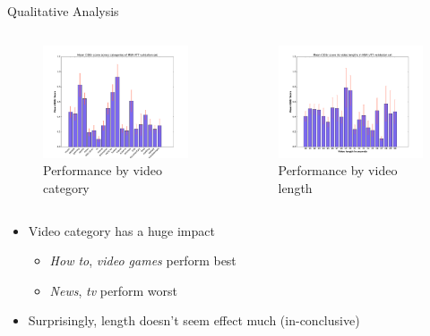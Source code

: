 \documentclass{beamer}
\begin{document}
\begin{frame}{Qualitative Analysis}
\vspace{-5mm}
\begin{columns}
  \begin{figure}[t]
    \centering
    \includegraphics[trim={2cm 0 2cm 0},clip,width=0.8\linewidth]{images/VTTCiderCateg.pdf}
    \vspace{-5mm}
    \caption{Performance by video category}%
  \end{figure}
  \begin{figure}[t]
    \centering
    \includegraphics[trim={2cm 0 2cm 0},clip, width=0.8\linewidth]{images/VTTCiderLengths.pdf}
    \vspace{-5mm}
    \caption{Performance by video length}
    \label{fig:VttLenPerf}
  \end{figure}
\end{columns}
\begin{itemize}
    \item Video category has a huge impact
       \begin{itemize}
               \item \emph{How to}, \emph{video games} perform best 
               \item \emph{News}, \emph{tv} perform worst 
       \end{itemize}
    \item Surprisingly, length doesn't seem effect much (in-conclusive) 
\end{itemize}
\end{frame}
\end{document}
